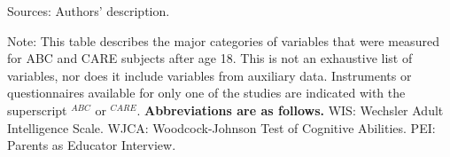 \begin{sidewaystable}[H]
\begin{threeparttable}
\begin{tabular}{L{3.5cm} C{3.5cm} C{5cm} C{1.5cm} C{1.5cm} C{6cm}}
	&		&							
        \\ \hline \hline							
\end{tabular}										
\begin{tablenotes}									
\scriptsize										
\item Sources: Authors' description. \\				
\item Note: This table describes the major categories of variables that were measured for ABC and CARE subjects after age 18. This is not an exhaustive list of variables, nor does it include variables from auxiliary data.  Instruments or questionnaires available for only one of the studies are indicated with the superscript $^{ABC}$ or $^{CARE}$. \textbf{Abbreviations are as follows.} WIS: Wechsler Adult Intelligence Scale.  WJCA: Woodcock-Johnson Test of Cognitive Abilities. PEI: Parents as Educator Interview.		\end{tablenotes}									
\end{threeparttable}								
\end{sidewaystable}																			


